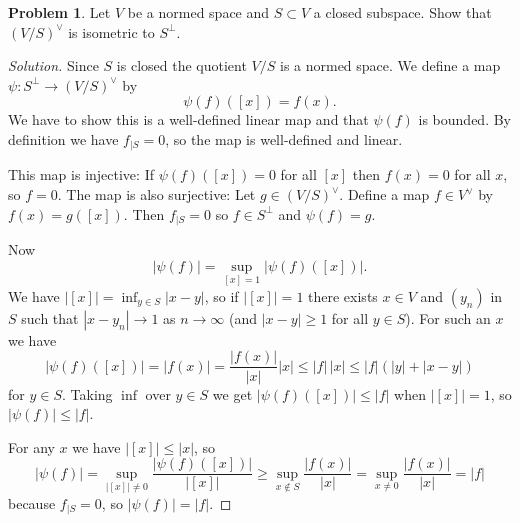 \documentclass[11pt]{article}
\theoremstyle{definition}
\newtheorem{prob}{Problem}
\begin{document}
\begin{prob}
Let $V$ be a normed space and $S \subset V$ a closed subspace.
Show that $(V / S)^\vee$ is isometric to $S^\perp$.
\end{prob}

\begin{proof}[Solution]
Since $S$ is closed the quotient $V/S$ is a normed space.
We define a map $\psi : S^\perp \to (V/S)^\vee$ by
\[
\psi(f)([x]) = f(x).
\]
We have to show this is a well-defined linear map and that $\psi(f)$ is
bounded. By definition we have $f_{|S} = 0$, so the map is well-defined and
linear.

This map is injective: If $\psi(f)([x]) = 0$ for all $[x]$ then $f(x) = 0$ for
all $x$, so $f = 0$.
The map is also surjective: Let $g \in (V/S)^\vee$.
Define a map $f \in V^\vee$ by $f(x) = g([x])$.
Then $f_{|S} = 0$ so $f \in S^\perp$ and $\psi(f) = g$.

Now
\[
|\psi(f)|
= \sup_{[x] = 1} |\psi(f)([x])|.
\]
We have $|[x]| = \inf_{y \in S}|x - y|$, so if $|[x]| = 1$ there exists
$x \in V$ and $(y_n)$ in $S$ such that $|x - y_n| \to 1$ as $n \to \infty$ (and
$|x - y| \geq 1$ for all $y \in S$).
For such an $x$ we have
\[
|\psi(f)([x])|
= |f(x)|
= \frac{|f(x)|}{|x|} |x|
\leq |f| \, |x|
\leq |f|(|y| + |x - y|)
\]
for $y \in S$.
Taking $\inf$ over $y \in S$ we get $|\psi(f)([x])| \leq |f|$ when $|[x]| = 1$,
so $|\psi(f)| \leq |f|$.

For any $x$ we have $|[x]| \leq |x|$, so
\[
|\psi(f)|
= \sup_{|[x]|\not= 0} \frac{|\psi(f)([x])|}{|[x]|}
\geq \sup_{x\not\in S} \frac{|f(x)|}{|x|}
= \sup_{x \not= 0} \frac{|f(x)|}{|x|}
= |f|
\]
because $f_{|S} = 0$, so $|\psi(f)| = |f|$.
\end{proof}
\end{document}
